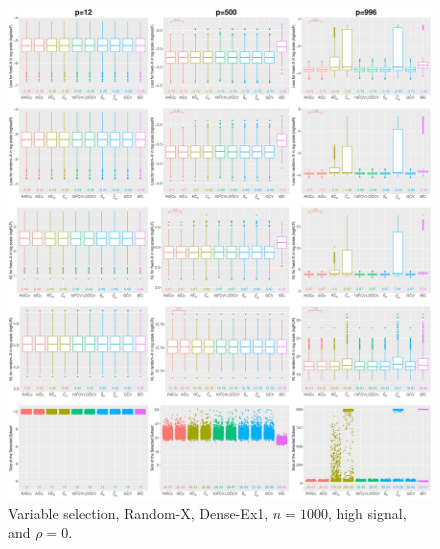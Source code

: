 \begin{figure}[!ht]
\centering
\includegraphics[width=\textwidth]{figures/supplement/randomx/subset_selection/Dense-Ex1_n1000_hsnr_rho0.eps}
\caption{Variable selection, Random-X, Dense-Ex1, $n=1000$, high signal, and $\rho=0$.}
\end{figure}
\clearpage
